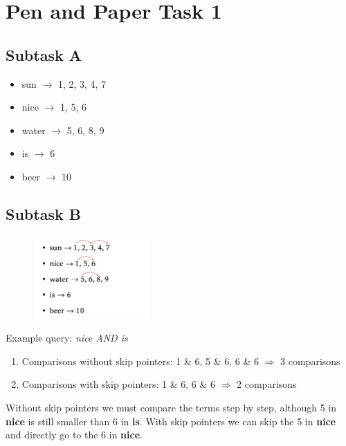 \documentclass[a4paper]{scrartcl}
\begin{document}
    
\section*{Pen and Paper Task 1}
    
\subsection*{Subtask A}

\begin{itemize}
    \item sun $\rightarrow$ 1, 2, 3, 4, 7
    \item nice $\rightarrow$ 1, 5, 6
    \item water $\rightarrow$ 5, 6, 8, 9
    \item is $\rightarrow$ 6
    \item beer $\rightarrow$ 10
\end{itemize}

\subsection*{Subtask B}
\begin{figure}[ht]
    \includegraphics[width=0.4\textwidth]{img/skip_pointers.png}
\end{figure}

Example query: \textit{nice AND is}
\begin{enumerate}
  \item Comparisons without skip pointers: 1 \& 6, 5 \& 6, 6 \& 6 $\Rightarrow$ 3 comparisons
  \item Comparisons with skip pointers: 1 \& 6, 6 \& 6 $\Rightarrow$ 2 comparisons
\end{enumerate}
Without skip pointers we must compare the terms step by step, although 5 in \textbf{nice} is still smaller than 6 in \textbf{is}. With skip pointers we can skip the 5 in \textbf{nice} and directly go to the 6 in \textbf{nice}.\\

\clearpage
\end{document}
